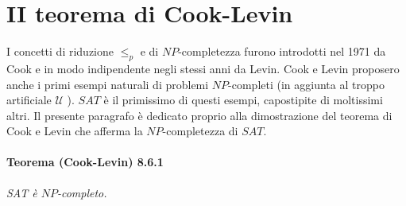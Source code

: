 \section{II teorema di Cook-Levin}

I concetti di riduzione $\leq_p$ e di $N P$-completezza furono introdotti nel
1971 da Cook e in modo indipendente negli stessi anni da Levin. Cook e Levin
proposero anche i primi esempi naturali di problemi $N P$-completi (in aggiunta
al troppo artificiale $\mathcal{U}$ ). $S A T$ è il primissimo di questi esempi,
capostipite di moltissimi altri. Il presente paragrafo è dedicato proprio alla
dimostrazione del teorema di Cook e Levin che afferma la $N P$-completezza di $S
    A T$.

\paragraph{Teorema (Cook-Levin) 8.6.1} \textit{SAT è $NP$-completo.}

